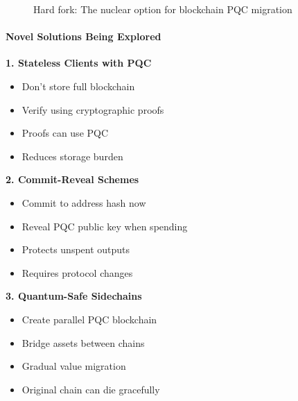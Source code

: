 \documentclass[11pt,a4paper]{article}
\begin{document}
\begin{figure}[h]
\centering
{}
\caption{Hard fork: The nuclear option for blockchain PQC migration}
\end{figure}

\paragraph{Novel Solutions Being Explored}

\textbf{1. Stateless Clients with PQC}
\begin{itemize}
    \item Don't store full blockchain
    \item Verify using cryptographic proofs
    \item Proofs can use PQC
    \item Reduces storage burden
\end{itemize}

\textbf{2. Commit-Reveal Schemes}
\begin{itemize}
    \item Commit to address hash now
    \item Reveal PQC public key when spending
    \item Protects unspent outputs
    \item Requires protocol changes
\end{itemize}

\textbf{3. Quantum-Safe Sidechains}
\begin{itemize}
    \item Create parallel PQC blockchain
    \item Bridge assets between chains
    \item Gradual value migration
    \item Original chain can die gracefully
\end{itemize}
\end{document}
